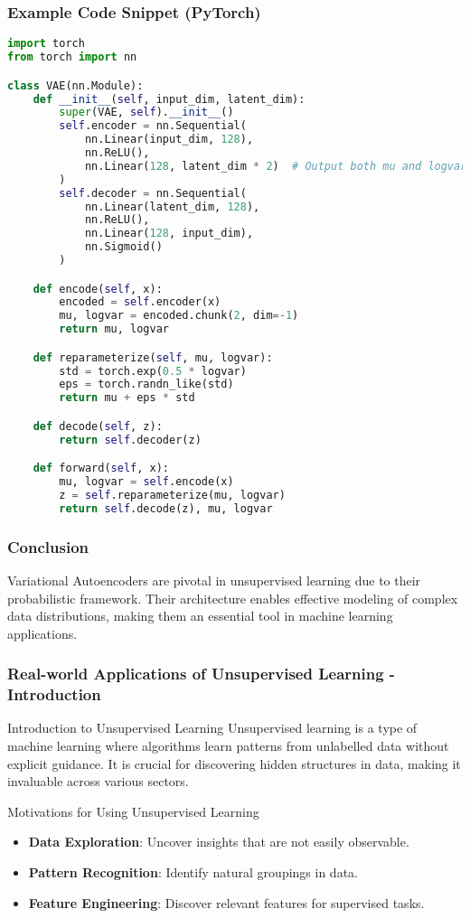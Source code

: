 \documentclass[aspectratio=169]{beamer}
\begin{document}
\begin{frame}[fragile]
    \frametitle{Example Code Snippet (PyTorch)}
    \begin{lstlisting}[language=Python]
import torch
from torch import nn

class VAE(nn.Module):
    def __init__(self, input_dim, latent_dim):
        super(VAE, self).__init__()
        self.encoder = nn.Sequential(
            nn.Linear(input_dim, 128),
            nn.ReLU(),
            nn.Linear(128, latent_dim * 2)  # Output both mu and logvar
        )
        self.decoder = nn.Sequential(
            nn.Linear(latent_dim, 128),
            nn.ReLU(),
            nn.Linear(128, input_dim),
            nn.Sigmoid()
        )

    def encode(self, x):
        encoded = self.encoder(x)
        mu, logvar = encoded.chunk(2, dim=-1)
        return mu, logvar

    def reparameterize(self, mu, logvar):
        std = torch.exp(0.5 * logvar)
        eps = torch.randn_like(std)
        return mu + eps * std

    def decode(self, z):
        return self.decoder(z)

    def forward(self, x):
        mu, logvar = self.encode(x)
        z = self.reparameterize(mu, logvar)
        return self.decode(z), mu, logvar
    \end{lstlisting}
\end{frame}

\begin{frame}[fragile]
    \frametitle{Conclusion}
    Variational Autoencoders are pivotal in unsupervised learning due to their probabilistic framework. Their architecture enables effective modeling of complex data distributions, making them an essential tool in machine learning applications.
\end{frame}

\begin{frame}[fragile]
  \frametitle{Real-world Applications of Unsupervised Learning - Introduction}
  \begin{block}{Introduction to Unsupervised Learning}
    Unsupervised learning is a type of machine learning where algorithms learn patterns from unlabelled data without explicit guidance. It is crucial for discovering hidden structures in data, making it invaluable across various sectors.
  \end{block}
  \begin{block}{Motivations for Using Unsupervised Learning}
    \begin{itemize}
        \item \textbf{Data Exploration}: Uncover insights that are not easily observable.
        \item \textbf{Pattern Recognition}: Identify natural groupings in data.
        \item \textbf{Feature Engineering}: Discover relevant features for supervised tasks.
    \end{itemize}
  \end{block}
\end{frame}
\end{document}
